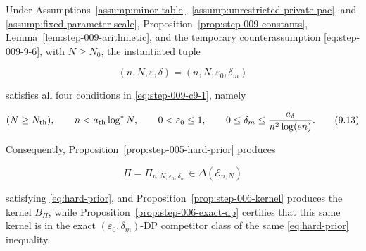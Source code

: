 \begin{proposition}
\label{prop:step-009-admissibility}
Under Assumptions~\ref{assump:minor-table},
\ref{assump:unrestricted-private-pac}, and
\ref{assump:fixed-parameter-scale},
Proposition~\ref{prop:step-009-constants},
Lemma~\ref{lem:step-009-arithmetic}, and the temporary
counterassumption \eqref{eq:step-009-9-6}, with \(N\ge N_0\), the instantiated tuple

\[
(n,N,\varepsilon,\delta)=(n,N,\varepsilon_0,\delta_m)
\]

satisfies all four conditions in \eqref{eq:step-009-c9-1}, namely

\[
(N\ge N_{\rm th}),\qquad
n<a_{\rm th}\log^*N,\qquad
0<\varepsilon_0\le1,\qquad
0\le\delta_m\le\frac{a_\delta}{n^2\log(en)}.
\tag{9.13}\label{eq:step-009-9-13}
\]

Consequently, Proposition~\ref{prop:step-005-hard-prior}
produces

\[
\Pi=\Pi_{n,N,\varepsilon_0,\delta_m}
\in\Delta(\mathcal E_{n,N})
\tag{9.14}\label{eq:step-009-9-14}
\]

satisfying \eqref{eq:hard-prior}, and 
Proposition~\ref{prop:step-006-kernel} produces the kernel \(B_\Pi\),
while Proposition~\ref{prop:step-006-exact-dp} certifies that this
same kernel is in the exact \((\varepsilon_0,\delta_m)\)-DP competitor
class of the same \eqref{eq:hard-prior} inequality.

\end{proposition}

